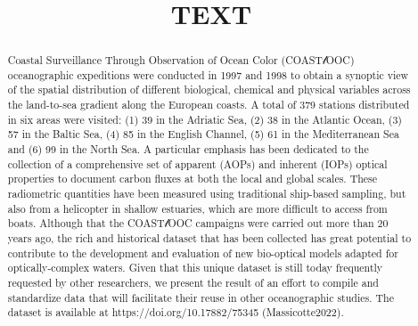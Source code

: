 \documentclass[essd, manuscript]{copernicus}
\begin{document}
\title{TEXT}



\Author[]{}{}
\Author[]{}{}









\received{}
\pubdiscuss{} %
\revised{}
\accepted{}
\published{}




\maketitle

\begin{abstract}
    Coastal Surveillance Through Observation of Ocean Color (COAST$\mathscr{l}$OOC) oceanographic expeditions were conducted in 1997 and 1998 to obtain a synoptic view of the spatial distribution of different biological, chemical and physical variables across the land-to-sea gradient along the European coasts. A total of 379 stations distributed in six areas were visited: (1) 39 in the Adriatic Sea, (2) 38 in the Atlantic Ocean, (3) 57 in the Baltic Sea, (4) 85 in the English Channel, (5) 61 in the Mediterranean Sea and (6) 99 in the North Sea. A particular emphasis has been dedicated to the collection of a comprehensive set of apparent (AOPs) and inherent (IOPs) optical properties to document carbon fluxes at both the local and global scales. These radiometric quantities have been measured using traditional ship-based sampling, but also from a helicopter in shallow estuaries, which are more difficult to access from boats. Although that the COAST$\mathscr{l}$OOC campaigns were carried out more than 20 years ago, the rich and historical dataset that has been collected has great potential to contribute to the development and evaluation of new bio-optical models adapted for optically-complex waters. Given that this unique dataset is still today frequently requested by other researchers, we present the result of an effort to compile and standardize data that will facilitate their reuse in other oceanographic studies. The dataset is available at https://doi.org/10.17882/75345 (Massicotte2022).
\end{abstract}
\end{document}
